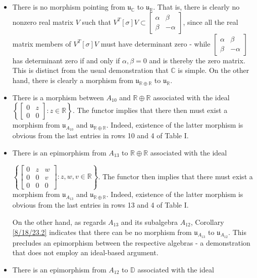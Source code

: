 \documentclass{amsart}
\numberwithin{equation}{section}
\theoremstyle{definition}
\numberwithin{theorem}{section}
\begin{document}
\begin{itemize}
\item  There is no morphism pointing from $\mathfrak{u}_{\mathbb{C}}$ to $\mathfrak{u}_{\mathbb{R}}$. That is, there is clearly no nonzero real matrix $V$ such that $V^T[\sigma]V \subset \left[\begin{array}{ccc}
 \alpha & \beta   \\ 
 \beta & -\alpha    
\end{array}\right]$, since all the real matrix members of $V^T[\sigma]V$  must have determinant zero - while $\left[\begin{array}{ccc}
 \alpha & \beta   \\ 
 \beta & -\alpha    
\end{array}\right]$ has determinant zero if and only if $\alpha,\beta = 0$ and is thereby the zero matrix. This is distinct from the usual demonstration that $\mathbb{C}$ is simple.  On the other hand, there is clearly a morphism from $\mathfrak{u}_{\mathbb{R}\oplus\mathbb{R}}$ to $\mathfrak{u}_{\mathbb{R}}$.
\item There is a morphism between $A_{10}$ and $\mathbb{R}\oplus\mathbb{R}$ associated with the ideal $\left\{\left[\begin{array}{ccc}
 0 & z   \\ 
 0 & 0    
\end{array}\right]:z\in \mathbb{R}\right\}$.  The functor implies that there then must exist a morphism from $\mathfrak{u}_{A_{10}}$ and $\mathfrak{u}_{\mathbb{R}\oplus\mathbb{R}}$.  Indeed, existence of the latter morphism is obvious from the last entries in rows 10 and 4 of Table I. 
\item There is an epimorphism from $A_{13}$ to $\mathbb{R}\oplus\mathbb{R}$ associated with the ideal

 $\left\{\left[\begin{array}{ccc}
0  & z & w   \\
 0 & 0 & v \\
 0 & 0 & 0    
\end{array}\right]:z,w,v\in\mathbb{R}\right\}$. The functor then implies that there must exist a morphism from $\mathfrak{u}_{A_{13}}$ and $\mathfrak{u}_{\mathbb{R}\oplus\mathbb{R}}$.  Indeed, existence of the latter morphism is obvious from the last entries in rows 13 and 4 of Table I.  

On the other hand, as regards $A_{13}$ and its subalgebra $A_{12}$, Corollary \ref{8/18/23.2} indicates that there can be no morphism from $\mathfrak{u}_{A_{13}}$ to $\mathfrak{u}_{A_{12}}$.  This precludes an epimorphism between the respective algebras - a demonstration that does not employ an ideal-based argument.
\item 
There is an epimorphism from $A_{12}$ to  $\mathbb{D}$ associated with the ideal


\end{itemize}
\end{document}
